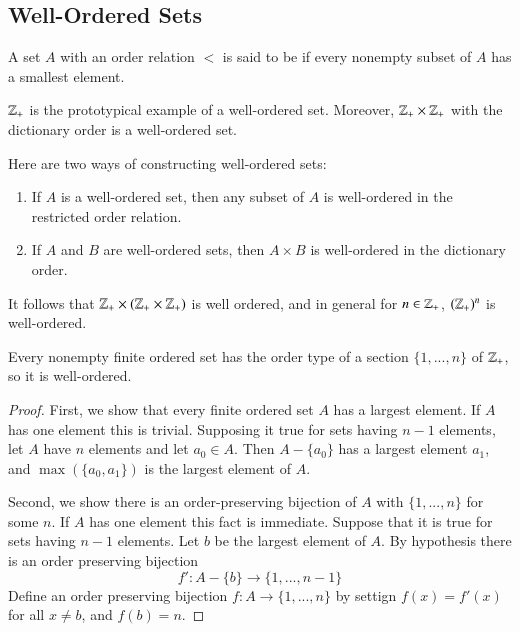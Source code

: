 \documentclass[12pt, a4paper, oneside, openright, titlepage]{book}
\begin{document}
\begin{appendices}
    \section{Well-Ordered Sets}

    
    \begin{definition}
        A set $A$ with an order relation $<$ is said to be  if every nonempty subset of $A$ has a smallest element.
    \end{definition}

    \begin{example}
        $\mathbb Z_+$ is the prototypical example of a well-ordered set. Moreover, $\mathbb Z_+\times \mathbb Z_+$ with the dictionary order is a well-ordered set.
    \end{example}

    \begin{remark}
        Here are two ways of constructing well-ordered sets:\begin{enumerate}
            \item If $A$ is a well-ordered set, then any subset of $A$ is well-ordered in the restricted order relation.
            \item If $A$ and $B$ are well-ordered sets, then $A\times B$ is well-ordered in the dictionary order.
        \end{enumerate}
        It follows that $\mathbb Z_+\times(\mathbb Z_+\times \mathbb Z_+)$ is well ordered, and in general for $n \in \mathbb Z_+$, $(\mathbb Z_+)^n$ is well-ordered.
    \end{remark}

    \begin{theorem}
        Every nonempty finite ordered set has the order type of a section $\{1,...,n\}$ of $\mathbb Z_+$, so it is well-ordered.
    \end{theorem}
    \begin{proof}
        First, we show that every finite ordered set $A$ has a largest element. If $A$ has one element this is trivial. Supposing it true for sets having $n-1$ elements, let $A$ have $n$ elements and let $a_0 \in A$. Then $A-\{a_0\}$ has a largest element $a_1$, and $\max(\{a_0,a_1\})$ is the largest element of $A$.


        Second, we show there is an order-preserving bijection of $A$ with $\{1,...,n\}$ for some $n$. If $A$ has one element this fact is immediate. Suppose that it is true for sets having $n-1$ elements. Let $b$ be the largest element of $A$. By hypothesis there is an order preserving bijection \begin{equation*}
            f':A-\{b\}\rightarrow \{1,...,n-1\}
        \end{equation*}
        Define an order preserving bijection $f:A\rightarrow \{1,...,n\}$ by settign $f(x) = f'(x)$ for all $x \neq b$, and $f(b) = n$.
    \end{proof}


\end{appendices}
\end{document}
